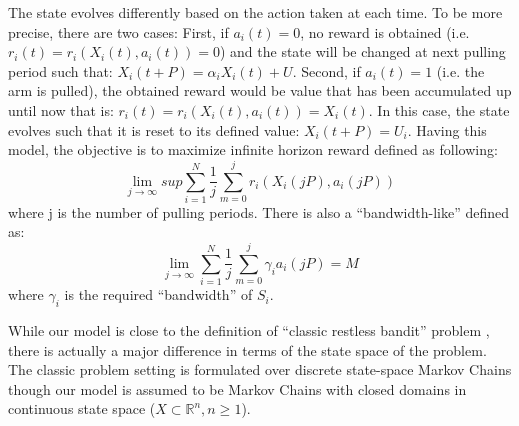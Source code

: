 \documentclass[conference]{IEEEtran}
\begin{document}
The state evolves differently based on the action taken at each time. To be more precise, there are two cases: First, if $a_i(t)=0$, no reward is obtained (i.e. $r_i(t) = r_i(X_i(t), a_i(t)) = 0$) and the state will be changed at next pulling period such that: $X_i(t+P) = \alpha_i X_i(t) + U$. Second, if $a_i(t) = 1$ (i.e. the arm is pulled), the obtained reward would be value that has been accumulated up until now that is: $r_i(t) = r_i(X_i(t), a_i(t)) = X_i(t)$. In this case, the state evolves such that it is reset to its defined value: $X_i(t+P) = U_i$. Having this model, the objective is to maximize infinite horizon reward defined as following: 
\begin{equation}
          \lim_{j \rightarrow \infty} sup \sum_{i=1}^{N} \frac{1}{j} \sum_{m=0}^{j} r_i(X_i(jP), a_i(jP))
\end{equation}
where j is the number of pulling periods. There is also a ``bandwidth-like'' defined as:
\begin{equation}
          \lim_{j\rightarrow\infty} \sum_{i=1}^{N} \frac{1}{j} \sum_{m=0}^{j} \gamma_i a_i(jP)=M
\end{equation}
where $\gamma_i$ is the required ``bandwidth'' of $S_i$.

While our model is close to the definition of ``classic restless bandit'' problem \cite{whittle1988}, there is actually a major difference in terms of the state space of the problem. The classic problem setting is formulated over discrete state-space Markov Chains though our model is assumed to be Markov Chains with closed domains in continuous state space ($X \subset \mathbb{R}^n, n\geq1$).
\end{document}
